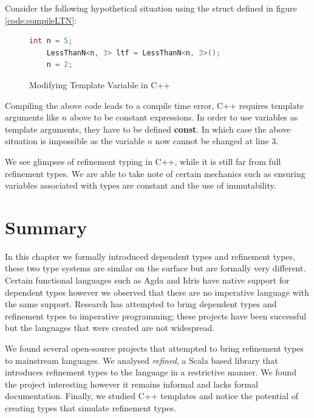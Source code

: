 \documentclass[a4paper,12pt]{report}
\begin{document}
\par
Consider the following hypothetical situation using the struct defined in 
figure \ref{code:compileLTN}: 

\begin{figure}[H]
  \begin{lstlisting}[language=c++]     
    int n = 5;
    LessThanN<n, 3> ltf = LessThanN<n, 3>();
    n = 2;
  \end{lstlisting}
  \caption{Modifying Template Variable in C++}
\end{figure}

\par
Compiling the above code leads to a compile time error, C++ requires template 
arguments like $n$ above to be constant expressions. In order to use variables as template 
arguments, they have to be defined \textbf{const}. In which case the above 
situation is impossible as the variable $n$ now cannot be changed at line 3. 

\par
We see glimpses of refinement typing in C++, while it is still far from full 
refinement types. We are able to take note of certain mechanics such as ensuring 
variables associated with types are constant and the use of immutability. 

\section{Summary}
In this chapter we formally introduced dependent types and refinement types, 
these two type systems are similar on the surface but are formally very 
different. Certain functional languages such as Agda and Idris have native support for 
dependent types however we observed that there are no imperative language with 
the same support. Research has attempted to bring dependent types and refinement types 
to imperative programming; these projects have been successful but the languages 
that were created are not widespread. 

\par
We found several open-source projects that attempted to bring refinement 
types to mainstream languages. We analysed \textit{refined}, a Scala based library that 
introduces refinement types to the language in a restrictive manner. We found the 
project interesting however it remains informal and lacks formal documentation. 
Finally, we studied C++ templates and notice the potential of creating  
types that simulate refinement types.
\end{document}
